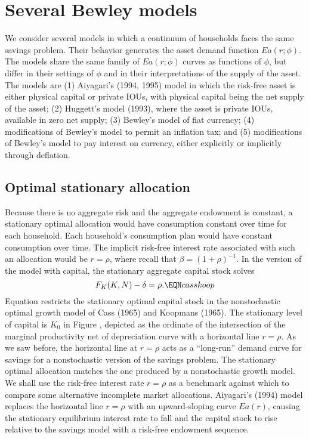 \section{Several Bewley models}

   We consider several models in which  a continuum of households faces the
same savings problem.  Their behavior generates the asset demand function $E a(r;\phi)$.
The models share the same family  of $E a(r;\phi)$ curves as functions of $\phi$, but differ in their
settings of $\phi$ and in their interpretations of the supply of the asset.
The models are (1) Aiyagari's (1994, 1995) model in which the risk-free asset
is either physical capital or private IOUs, with physical capital being the
net supply of the asset; (2) Huggett's model (1993), where the asset is private
IOUs, available in zero net supply; (3) Bewley's model of fiat currency;
(4) modifications of Bewley's model to permit an inflation tax;
and (5) modifications of Bewley's model to pay interest on currency,
either explicitly or implicitly through deflation.



\subsection{Optimal stationary allocation}

Because there is no aggregate
risk and the aggregate endowment is constant,
 a stationary optimal  allocation
would have consumption constant over time for each
household. Each household's  consumption plan would have constant
consumption over time.
The implicit risk-free interest rate associated with such an
allocation would be  $r = \rho$, where recall that $\beta = (1+\rho)^{-1}$.  In the version
of the model with capital, the stationary aggregate capital stock
solves
$$ F_K(K,N) - \delta =   \rho. \EQN casskoop  $$
Equation  restricts the stationary
optimal capital stock in the nonstochastic optimal
growth model of Cass (1965) and Koopmans (1965).
  The stationary
level of capital is  $K_0$ in Figure , depicted as the ordinate
of the intersection
of the marginal productivity net of depreciation  curve with
a horizontal line  $r = \rho$.   As we saw before,
the horizontal line at $r=\rho$ acts as a ``long-run'' demand
curve for savings for a nonstochastic version of the savings
problem.
   The stationary optimal allocation matches the one produced
by a nonstochastic growth model.
We shall use the risk-free interest rate $r=\rho$ as a benchmark against
which to compare some alternative incomplete market allocations.
    Aiyagari's (1994) model  replaces the horizontal
line  $r=\rho$ with an upward-sloping curve $E a(r)$, causing the stationary
equilibrium interest rate to fall  and the  capital stock to rise
relative to the  savings model with a risk-free endowment sequence.


